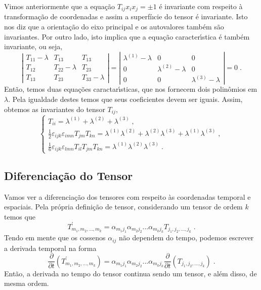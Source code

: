    Vimos anteriormente que a equa\c{c}\~ao $T_{ij}x_i x_j = \pm 1$
\'e invariante com respeito \`a transforma\c{c}\~ao de coordenadas
e assim a superf\'i{\i}cie do tensor \'e invariante. Isto nos diz
que a orienta\c{c}\~ao do eixo principal e os autovalores tamb\'em
s\~ao invariantes. Por outro lado, isto implica que a
equa\c{c}\~ao caracter\'{\i}stica \'e tamb\'em invariante, ou
seja,
\begin{equation} \left|
\begin{array}{ccc}
   T_{11}-\lambda & T_{13} & T_{13} \\
   T_{12} & T_{22}-\lambda & T_{23} \\
   T_{13} & T_{23} & T_{33}-\lambda
\end{array} \right|=\left|
\begin{array}{ccc}
   \lambda^{(1)}-\lambda & 0 & 0 \\
   0 & \lambda^{(2)}-\lambda & 0 \\
   0 & 0 & \lambda^{(3)}-\lambda
\end{array} \right|=0\;.
   \label{auto_caract_inv}
\end{equation}
Ent\~ao, temos duas equa\c{c}\~oes caractar\'{\i}sticas, que nos
fornecem dois polin\^omios em $\lambda$. Pela igualdade destes
temos que seus coeficientes devem ser iguais. Assim, obtemos as
invariantes do tensor $T_{ij}$,
\begin{equation} \left\{
\begin{array}{l}
T_{ii}=\lambda^{(1)}+\lambda^{(2)}+\lambda^{(3)}\;, \\
\frac{1}{2}\varepsilon_{ijk}\varepsilon_{imn}T_{jm}T_{kn}=\lambda^{(1)}\lambda^{(2)}+\lambda^{(2)}\lambda^{(3)}+\lambda^{(1)}\lambda^{(3)}\;, \\
\frac{1}{6}\varepsilon_{ijk}\varepsilon_{lmn}T_{il}T_{jm}T_{kn}=\lambda^{(1)}\lambda^{(2)}\lambda^{(3)}\;.
\end{array} \right.
\end{equation}


\subsection{Diferencia\c{c}\~ao do Tensor}

Vamos ver a diferencia\c{c}\~ao dos tensores com respeito \`as
coordenadas temporal e espaciais. Pela pr\'opria defini\c{c}\~ao
de tensor, considerando um tensor de ordem $k$ temos que
\begin{equation}
T^{'}_{m_1,m_2,...,m_k}=\alpha_{m_1 j_1}\alpha_{m_2
j_2}...\alpha_{m_k j_k}T_{j_1,j_2,...,j_k} \;.
\label{tensor_mudanca}
\end{equation}
Tendo em mente que os cossenos $\alpha_{ij}$ n\~ao dependem do
tempo, podemos escrever a derivada temporal na forma
\begin{equation}
\frac{\partial}{\partial t}(T^{'}_{m_1,m_2,...,m_k})=\alpha_{m_1
j_1}\alpha_{m_2 j_2}...\alpha_{m_k j_k} \frac{\partial}{\partial
t}(T_{j_1,j_2,...,j_k}) \;.
\end{equation}
Ent\~ao, a derivada no tempo do tensor continua sendo um tensor, e
al\'em disso, de mesma ordem.


